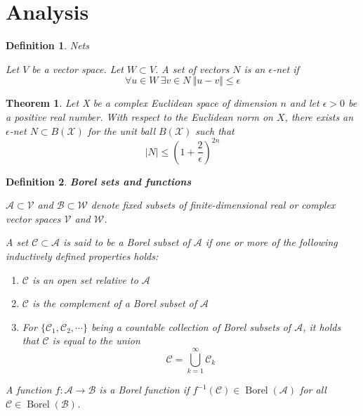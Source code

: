 \documentclass[aps,pra,onecolumn,notitlepage,superscriptaddress]{revtex4-1}
\newcommand{\spc}[1]{\mathcal{#1}}
\newcommand{\op}[1]{\operatorname{#1}}
\newtheorem{theo}{Theorem}
\newtheorem{defi}{Definition}
\begin{document}
    \section{Analysis}
    \begin{defi}
        Nets

        Let $V$ be a vector space. Let $W \subset V$. A set of vectors $N$ is an $\epsilon$-net if
        \begin{equation*}
            \forall u \in W \ \exists v \in  N \ \Vert u-v \Vert \leq \epsilon
        \end{equation*}
    \end{defi}

    \begin{theo}
        Let X be a complex Euclidean space of dimension $n$ and let $\epsilon > 0$ be a positive real number. With respect to the Euclidean norm on $X$, there exists an $\epsilon$-net $N \subset B(\spc X)$ for the unit ball $B(\spc X)$ such that
        \begin{equation}
            |N| \leq \left( 1+\frac{2}{\epsilon} \right)^{2n}
        \end{equation}
    \end{theo}

    \begin{defi}
        \textbf{Borel sets and functions}

        $\spc A \subset \spc V$ and $\spc B \subset \spc W$ denote fixed subsets of finite-dimensional real or complex vector spaces $\spc V$ and $\spc W$.

        A set $\spc C \subset \spc A$ is said to be a Borel subset of $\spc A$ if one or more of the following inductively defined properties holds:
        \begin{enumerate}
            \item $\spc C$ is an open set relative to $\spc A$
            \item $\spc C$ is the complement of a Borel subset of $\spc A$
            \item For $\{\spc C_1, \spc C_2, \cdots\}$ being a countable collection of Borel subsets of $\spc A$, it holds that $\spc C$ is equal to the union
            \begin{equation}
                \spc C = \bigcup_{k=1}^\infty \spc C_k
            \end{equation}
        \end{enumerate}

        A function $f: \spc A \to \spc B$ is a Borel function if $f^{-1}(\spc C) \in \op{Borel}(\spc A)$ for all $\spc C \in \op{Borel}(\spc B)$.
    \end{defi}
\end{document}

